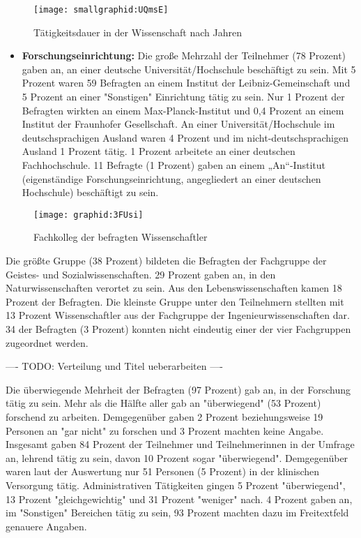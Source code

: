 \begin{figure}[h!]
\texttt{[image: smallgraphid:UQmsE]}
\caption{Tätigkeitsdauer in der Wissenschaft nach Jahren}
\end{figure}

\begin{itemize}
\item \textbf{Forschungseinrichtung:} Die große Mehrzahl der Teilnehmer (78 Prozent) gaben an, an einer deutsche Universität/Hochschule beschäftigt zu sein. Mit 5 Prozent waren 59 Befragten an einem Institut der Leibniz-Gemeinschaft und 5 Prozent an einer "Sonstigen" Einrichtung tätig zu sein. Nur 1 Prozent der Befragten wirkten an einem Max-Planck-Institut und 0,4 Prozent an einem Institut der Fraunhofer Gesellschaft. An einer Universität/Hochschule im deutschsprachigen Ausland waren 4 Prozent und im nicht-deutschsprachigen Ausland 1 Prozent tätig. 1 Prozent arbeitete an einer deutschen Fachhochschule. 11 Befragte (1 Prozent) gaben an einem „An“-Institut (eigenständige Forschungseinrichtung, angegliedert an einer deutschen Hochschule) beschäftigt zu sein.
\end{itemize}

\begin{figure}[h!]
\texttt{[image: graphid:3FUsi]}
\caption{Fachkolleg der befragten Wissenschaftler}
\end{figure}

Die größte Gruppe (38 Prozent) bildeten die Befragten der Fachgruppe der Geistes- und Sozialwissenschaften. 29 Prozent gaben an, in den Naturwissenschaften verortet zu sein. Aus den Lebenswissenschaften kamen 18 Prozent der Befragten. Die kleinste Gruppe unter den Teilnehmern stellten mit 13 Prozent Wissenschaftler aus der Fachgruppe der Ingenieurwissenschaften dar. 34 der Befragten (3 Prozent) konnten nicht eindeutig einer der vier Fachgruppen zugeordnet werden.

---- TODO: Verteilung und Titel ueberarbeiten ----

Die überwiegende Mehrheit der Befragten (97 Prozent) gab an, in der Forschung tätig zu sein. Mehr als die Hälfte aller gab an "überwiegend" (53 Prozent) forschend zu arbeiten. Demgegenüber gaben 2 Prozent beziehungsweise 19 Personen an "gar nicht" zu forschen und 3 Prozent machten keine Angabe. Insgesamt gaben 84 Prozent der Teilnehmer und Teilnehmerinnen in der Umfrage an, lehrend tätig zu sein, davon 10 Prozent sogar "überwiegend". Demgegenüber waren laut der Auswertung nur 51 Personen (5 Prozent) in der klinischen Versorgung tätig. Administrativen Tätigkeiten gingen 5 Prozent "überwiegend", 13 Prozent "gleichgewichtig" und 31 Prozent "weniger" nach. 4 Prozent gaben an, im "Sonstigen" Bereichen tätig zu sein, 93 Prozent machten dazu im Freitextfeld genauere Angaben.

